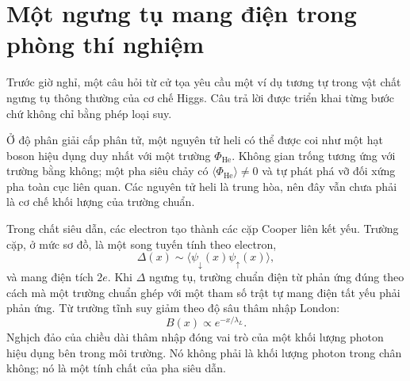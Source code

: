 \section{Một ngưng tụ mang điện trong phòng thí nghiệm}

Trước giờ nghỉ, một câu hỏi từ cử tọa yêu cầu một ví dụ tương tự trong vật chất ngưng tụ thông thường của cơ chế Higgs. Câu trả lời được triển khai từng bước chứ không chỉ bằng phép loại suy.

\begin{classroomqa}
\end{classroomqa}

Ở độ phân giải cấp phân tử, một nguyên tử heli có thể được coi như một hạt boson hiệu dụng duy nhất với một trường \(\Phi_{\mathrm{He}}\). Không gian trống tương ứng với trường bằng không; một pha siêu chảy có
\(\langle\Phi_{\mathrm{He}}\rangle\ne0\) và tự phát phá vỡ đối xứng pha toàn cục liên quan. Các nguyên tử heli là trung hòa, nên đây vẫn chưa phải là cơ chế khối lượng của trường chuẩn.

Trong chất siêu dẫn, các electron tạo thành các cặp Cooper liên kết yếu. Trường cặp, ở mức sơ đồ, là một song tuyến tính theo electron,
\begin{equation}
  \Delta(x)\sim\langle\psi_\downarrow(x)\psi_\uparrow(x)\rangle,
  \label{eq:l10-cooper-order-parameter}
\end{equation}
và mang điện tích \(2e\). Khi \(\Delta\) ngưng tụ, trường chuẩn điện từ phản ứng đúng theo cách mà một trường chuẩn ghép với một tham số trật tự mang điện tất yếu phải phản ứng. Từ trường tĩnh suy giảm theo độ sâu thâm nhập London:
\begin{equation}
  B(x)\propto e^{-x/\lambda_L}.
  \label{eq:l10-meissner-screening}
\end{equation}
Nghịch đảo của chiều dài thâm nhập đóng vai trò của một khối lượng photon hiệu dụng bên trong môi trường. Nó không phải là khối lượng photon trong chân không; nó là một tính chất của pha siêu dẫn.

